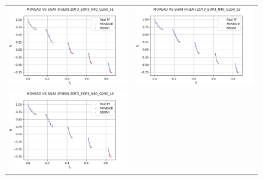 \begin{figure}[H]
    \centering
    \begin{tabular}{c c}
    \includegraphics[scale=0.5]{figures/ZDT3_EOP3_N40_G250_T6/s1_comp.png} &
    \includegraphics[scale=0.5]{figures/ZDT3_EOP3_N40_G250_T6/s2_comp.png}\\
    \includegraphics[scale=0.5]{figures/ZDT3_EOP3_N40_G250_T6/s3_comp.png} &

\end{tabular}
\end{figure}
